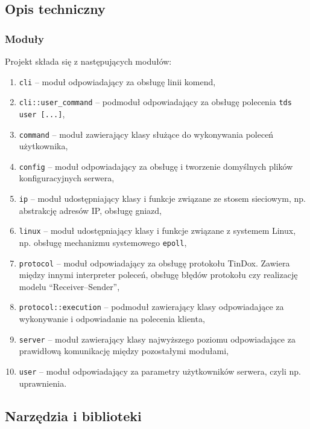 \documentclass[10pt,a4paper]{article}
\newcommand{\quotes}[1]{``#1''}
\begin{document}
\subsection{Opis techniczny}

\subsubsection{Moduły}
\noindent Projekt składa się z następujących modułów:
\begin{enumerate}
    \item \texttt{cli} -- moduł odpowiadający za obsługę linii komend,
    \item \texttt{cli::user\_command} -- podmoduł odpowiadający za obsługę polecenia \texttt{tds user [...]},
    \item \texttt{command} -- moduł zawierający klasy służące do wykonywania poleceń użytkownika,
    \item \texttt{config} -- moduł odpowiadający za obsługę i tworzenie domyślnych plików konfiguracyjnych serwera,
    \item \texttt{ip} -- moduł udostępniający klasy i funkcje związane ze stosem sieciowym, np. abstrakcję adresów IP, obsługę gniazd,
    \item \texttt{linux} -- moduł udostępniający klasy i funkcje związane z systemem Linux, np. obsługę mechanizmu systemowego \texttt{epoll},
    \item \texttt{protocol} -- moduł odpowiadający za obsługę protokołu TinDox. Zawiera między innymi interpreter poleceń, obsługę błędów protokołu czy realizację modelu \quotes{Receiver--Sender},
    \item \texttt{protocol::execution} -- podmoduł zawierający klasy odpowiadające za wykonywanie i odpowiadanie na polecenia klienta,
    \item \texttt{server} -- moduł zawierający klasy najwyższego poziomu odpowiadające za prawidłową komunikację między pozostałymi modułami,
    \item \texttt{user} -- moduł odpowiadający za parametry użytkowników serwera, czyli np. uprawnienia.
\end{enumerate}

\subsection{Narzędzia i biblioteki}
\end{document}
